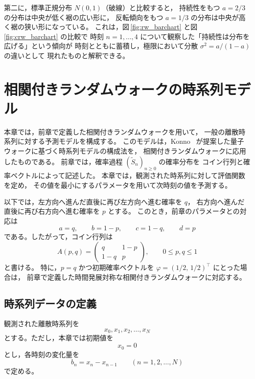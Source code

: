 \documentclass[a4j,dvipdfmx]{jsarticle}
\theoremstyle{plainnote}
\begin{document}
第二に，標準正規分布 $N(0,1)$（破線）と比較すると，
持続性をもつ $a=2/3$ の分布は中央が低く裾の広い形に，
反転傾向をもつ $a=1/3$ の分布は中央が高く裾の狭い形になっている。
これは，図\,\ref{fig:rw_barchart} と図\,\ref{fig:crw_barchart} の比較で
時刻 $n=1,\ldots,4$ について観察した「持続性は分布を広げる」という傾向が
時刻とともに蓄積し，極限において分散 $\sigma^2 = a/(1-a)$ の違いとして
現れたものと解釈できる。





\newpage
\section{相関付きランダムウォークの時系列モデル}

本章では，前章で定義した相関付きランダムウォークを用いて，
一般の離散時系列に対する予測モデルを構成する。
このモデルは，Konno~\cite{ref3} が提案した量子ウォークに基づく時系列モデルの構成法を，
相関付きランダムウォークに応用したものである。
前章では，確率過程 $(\tilde{S}_n)_{n\geq0}$ の確率分布を
コイン行列と確率ベクトルによって記述した。
本章では，観測された時系列に対して評価関数を定め，
その値を最小にするパラメータを用いて次時刻の値を予測する。

以下では，左方向へ進んだ直後に再び左方向へ進む確率を $q$，
右方向へ進んだ直後に再び右方向へ進む確率を $p$ とする。
このとき，前章のパラメータとの対応は
\[
  a=q,\qquad b=1-p,\qquad c=1-q,\qquad d=p
\]
である。したがって，コイン行列は
\begin{equation}
  A(p,q)
  =
  \begin{pmatrix}
    q & 1-p \\
    1-q & p
  \end{pmatrix},
  \qquad 0\leq p,q\leq 1
  \label{eq:A_pq_model}
\end{equation}
と書ける。
特に，$p=q$ かつ初期確率ベクトルを $\varphi=(1/2,\,1/2)^\top$ にとった場合は，
前章で定義した時間発展対称な相関付きランダムウォークに対応する。

\subsection{時系列データの定義}

観測された離散時系列を
\[
  x_0,x_1,x_2,\ldots,x_N
\]
とする。ただし，本章では初期値を
\begin{equation}
  x_0=0
  \label{eq:model_x0}
\end{equation}
とし，各時刻の変化量を
\begin{equation}
  b_n=x_n-x_{n-1}
  \qquad (n=1,2,\ldots,N)
  \label{eq:model_bn}
\end{equation}
で定める。
\end{document}
